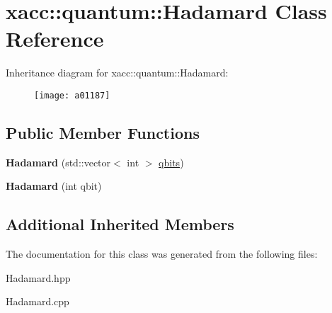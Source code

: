 \hypertarget{a01187}{}\section{xacc\+:\+:quantum\+:\+:Hadamard Class Reference}
\label{a01187}
Inheritance diagram for xacc\+:\+:quantum\+:\+:Hadamard\+:\begin{figure}[H]
\begin{center}
\leavevmode
\texttt{[image: a01187]}
\end{center}
\end{figure}
\subsection*{Public Member Functions}
\begin{DoxyCompactItemize}
\item 
\mbox{\label{a01187_a1f26925eeb4a52ca7e52dd9158fe7005}} 
{\bfseries Hadamard} (std\+::vector$<$ int $>$ \hyperlink{a01159_a2a56be6c2519ea65df4d06f4abae1393}{qbits})
\item 
\mbox{\label{a01187_aac4e06aae35583bcce39b6b178948364}} 
{\bfseries Hadamard} (int qbit)
\end{DoxyCompactItemize}
\subsection*{Additional Inherited Members}


The documentation for this class was generated from the following files\+:\begin{DoxyCompactItemize}
\item 
Hadamard.\+hpp\item 
Hadamard.\+cpp\end{DoxyCompactItemize}
